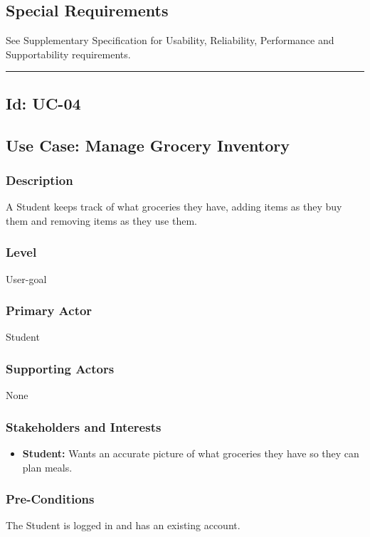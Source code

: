 \documentclass[10pt,letterpaper]{article}
\newcommand{\ucseparator}{\vspace{1em}\noindent\rule{\linewidth}{0.4pt}\vspace{1.5em}}
\begin{document}
\subsection*{Special Requirements}
See Supplementary Specification for Usability, Reliability, Performance and Supportability requirements.

\ucseparator

\subsection*{Id: UC-04}

\subsection*{Use Case: Manage Grocery Inventory}

\subsubsection*{Description}
A Student keeps track of what groceries they have, adding items as they buy them and removing items as they use them.

\subsubsection*{Level}
User-goal

\subsubsection*{Primary Actor}
Student

\subsubsection*{Supporting Actors}
None

\subsubsection*{Stakeholders and Interests}
\begin{itemize}
    \item \textbf{Student:} Wants an accurate picture of what groceries they have so they can plan meals.
\end{itemize}

\subsubsection*{Pre-Conditions}
The Student is logged in and has an existing account.
\end{document}
